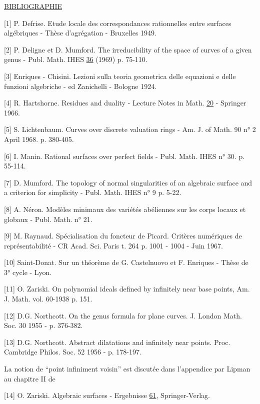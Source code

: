\underline{BIBLIOGRAPHIE}

[1] \quad P. Defrise. Etude locale des correspondances rationnelles entre surfaces algébriques - Thèse d'agrégation - Bruxelles 1949.

[2] \quad P. Deligne et D. Mumford. The irreducibility of the space of curves of a given genus - Publ. Math. IHES \underline{36} (1969) p. 75-110.

[3] \quad Enriques - Chisini. Lezioni sulla teoria geometrica delle equazioni e delle funzioni algebriche - ed Zanichelli - Bologne 1924.

[4] \quad R. Hartshorne. Residues and duality - Lecture Notes in Math. \underline{20} - Springer 1966.

[5] \quad S. Lichtenbaum. Curves over discrete valuation rings - Am. J. of Math. 90 n° 2 April 1968. p. 380-405.

[6] \quad I. Manin. Rational surfaces over perfect fields - Publ. Math. IHES n° 30. p. 55-114.

[7] \quad D. Mumford. The topology of normal singularities of an algebraic surface and a criterion for simplicity - Publ. Math. IHES n° 9 p. 5-22.

[8] \quad A. Néron. Modèles minimaux des variétés abéliennes sur les corps locaux et globaux - Publ. Math. n° 21.



[9] \quad M. Raynaud. Spécialisation du foncteur de Picard. Critères numériques de représentabilité - CR Acad. Sci. Paris t. 264 p. 1001 - 1004 - Juin 1967.

[10] \quad Saint-Donat. Sur un théorème de G. Castelnuovo et F. Enriques - Thèse de 3° cycle - Lyon.

[11] \quad O. Zariski. On polynomial ideals defined by infinitely near base points, Am. J. Math. vol. 60-1938 p. 151.

[12] \quad D.G. Northcott. On the genus formula for plane curves. J. London Math. Soc. 30 1955 - p. 376-382.

[13] \quad D.G. Northcott. Abstract dilatations and infinitely near points. Proc. Cambridge Philos. Soc. 52 1956 - p. 178-197.

La notion de ``point infiniment voisin'' est discutée dans l'appendice par Lipman au chapitre II de

[14] \quad O. Zariski. Algebraic surfaces - Ergebnisse \underline{61}, Springer-Verlag.
